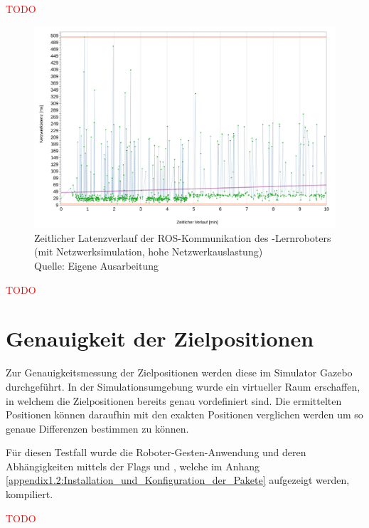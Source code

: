 \textcolor{red}{TODO}

\begin{figure}[htb]
	\centering
	\includegraphics[width=1.04\textwidth]{images/ergebnisse/ROS_App_mit_Netzwerksimulation_und_hohe_Auslastung}
	\caption[Zeitlicher Latenzverlauf der ROS-Kommunikation des -Lernroboters (mit Netzwerksimulation, hohe Netzwerkauslastung)]{Zeitlicher Latenzverlauf der ROS-Kommunikation des -Lernroboters (mit Netzwerksimulation, hohe Netzwerkauslastung)\\Quelle: Eigene Ausarbeitung}
	\label{fig:measurement_robot_ros_with_network_simulation_high_network_traffic}
\end{figure}
\FloatBarrier

\textcolor{red}{TODO}

\section{Genauigkeit der Zielpositionen}
Zur Genauigkeitsmessung der Zielpositionen werden diese im Simulator Gazebo durchgeführt. In der Simulationsumgebung wurde ein virtueller Raum erschaffen, in welchem die Zielpositionen bereits genau vordefiniert sind. Die ermittelten Positionen können daraufhin mit den exakten Positionen verglichen werden um so genaue Differenzen bestimmen zu können.

Für diesen Testfall wurde die Roboter-Gesten-Anwendung und deren Abhängigkeiten mittels der Flags  und , welche im Anhang \ref{appendix1.2:Installation_und_Konfiguration_der_Pakete} aufgezeigt werden, kompiliert.

\textcolor{red}{TODO}

